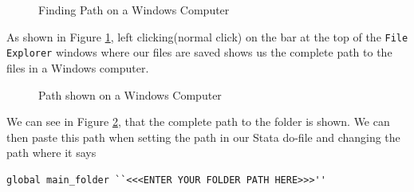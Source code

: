 \documentclass[]{article}
\begin{document}
\begin{figure}[H]
	\centering
	\caption{Finding Path on a Windows Computer}
	\label{fig:pathwin}
\end{figure}
As shown in Figure \ref{fig:pathwin}, left clicking(normal click) on the bar at the top of the \texttt{File Explorer} windows where our files are saved shows us the complete path to the files in a Windows computer. \\

\begin{figure}[H]
	\centering
	\caption{Path shown on a Windows Computer}
	\label{fig:pathwin2}
\end{figure}

We can see in Figure \ref{fig:pathwin2}, that the complete path to the folder is shown. We can then paste this path when setting the path in our Stata do-file and changing the path where it says \begin{verbatim}
global main_folder ``<<<ENTER YOUR FOLDER PATH HERE>>>''
\end{verbatim} 
	
\end{document}
